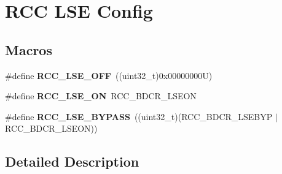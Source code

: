 \hypertarget{group___r_c_c___l_s_e___config}{}\section{R\+CC L\+SE Config}
\label{group___r_c_c___l_s_e___config}
\subsection*{Macros}
\begin{DoxyCompactItemize}
\item 
\mbox{\label{group___r_c_c___l_s_e___config_ga6645c27708d0cad1a4ab61d2abb24c77}} 
\#define {\bfseries R\+C\+C\+\_\+\+L\+S\+E\+\_\+\+O\+FF}~((uint32\+\_\+t)0x00000000\+U)
\item 
\mbox{\label{group___r_c_c___l_s_e___config_gac981ea636c2f215e4473901e0912f55a}} 
\#define {\bfseries R\+C\+C\+\_\+\+L\+S\+E\+\_\+\+ON}~R\+C\+C\+\_\+\+B\+D\+C\+R\+\_\+\+L\+S\+E\+ON
\item 
\mbox{\label{group___r_c_c___l_s_e___config_gaad580157edbae878edbcc83c5a68e767}} 
\#define {\bfseries R\+C\+C\+\_\+\+L\+S\+E\+\_\+\+B\+Y\+P\+A\+SS}~((uint32\+\_\+t)(R\+C\+C\+\_\+\+B\+D\+C\+R\+\_\+\+L\+S\+E\+B\+YP $\vert$ R\+C\+C\+\_\+\+B\+D\+C\+R\+\_\+\+L\+S\+E\+ON))
\end{DoxyCompactItemize}


\subsection{Detailed Description}
